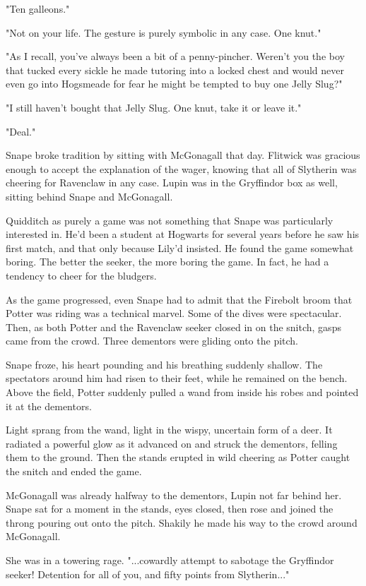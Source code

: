 "Ten galleons."

"Not on your life. The gesture is purely symbolic in any case. One knut."

"As I recall, you've always been a bit of a penny-pincher. Weren't you the boy that tucked every sickle he made tutoring into a locked chest and would never even go into Hogsmeade for fear he might be tempted to buy one Jelly Slug?"

"I still haven't bought that Jelly Slug. One knut, take it or leave it."

"Deal."

Snape broke tradition by sitting with McGonagall that day. Flitwick was gracious enough to accept the explanation of the wager, knowing that all of Slytherin was cheering for Ravenclaw in any case. Lupin was in the Gryffindor box as well, sitting behind Snape and McGonagall.

Quidditch as purely a game was not something that Snape was particularly interested in. He'd been a student at Hogwarts for several years before he saw his first match, and that only because Lily'd insisted. He found the game somewhat boring. The better the seeker, the more boring the game. In fact, he had a tendency to cheer for the bludgers.

As the game progressed, even Snape had to admit that the Firebolt broom that Potter was riding was a technical marvel. Some of the dives were spectacular. Then, as both Potter and the Ravenclaw seeker closed in on the snitch, gasps came from the crowd. Three dementors were gliding onto the pitch.

Snape froze, his heart pounding and his breathing suddenly shallow. The spectators around him had risen to their feet, while he remained on the bench. Above the field, Potter suddenly pulled a wand from inside his robes and pointed it at the dementors.

Light sprang from the wand, light in the wispy, uncertain form of a deer. It radiated a powerful glow as it advanced on and struck the dementors, felling them to the ground. Then the stands erupted in wild cheering as Potter caught the snitch and ended the game.

McGonagall was already halfway to the dementors, Lupin not far behind her. Snape sat for a moment in the stands, eyes closed, then rose and joined the throng pouring out onto the pitch. Shakily he made his way to the crowd around McGonagall.

She was in a towering rage. "...cowardly attempt to sabotage the Gryffindor seeker! Detention for all of you, and fifty points from Slytherin..."

